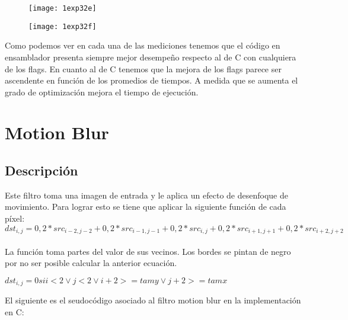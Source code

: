 ﻿\documentclass[a4paper]{article}
\begin{document}
\begin{figure}[h]
  \centering
    \texttt{[image: 1exp32e]}
\end{figure}

\begin{figure}[h]
  \centering
    \texttt{[image: 1exp32f]}
\end{figure}


Como podemos ver en cada una de las mediciones tenemos que el c\'odigo en ensamblador presenta siempre mejor desempeño respecto al de C con cualquiera de los flags. En cuanto al de C tenemos que la mejora de los flags parece ser ascendente en función de los promedios de tiempos. A medida que se aumenta el grado de optimización mejora el tiempo de ejecución.  
\section{Motion Blur}
\subsection{Descripci\'on}
Este filtro toma una imagen de entrada y le aplica un efecto de desenfoque de movimiento. Para lograr esto se tiene que aplicar la siguiente funci\'on de cada píxel:
\ \\
$dst_{i,j}=0,2*src_{i-2,j-2}+0,2*src_{i-1,j-1}+0,2*src_{i,j}+0,2*src_{i+1,j+1}+0,2*src_{i+2,j+2}$
\ \\
La funci\'on toma partes del valor de sus vecinos. Los bordes se pintan de negro por no ser posible calcular la anterior ecuaci\'on. 

$dst_{i,j}=0 si i<2 \vee j<2 \vee i+2>=tamy \vee j+2>=tamx$

El siguiente es el seudoc\'odigo asociado al filtro motion blur en la implementaci\'on en C:
\end{document}
